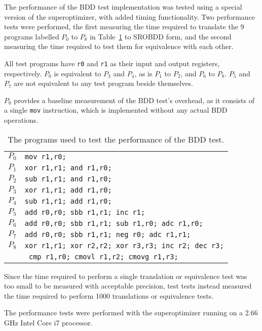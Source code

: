 \documentclass[a4paper,11pt]{kth-mag}
\begin{document}
The performance of the BDD test implementation was tested using a special version of the superoptimizer, with added timing functionality.
Two performance tests were performed,
the first measuring the time required to translate the 9 programs labelled $P_0$ to $P_8$ in Table~\ref{tab:test_programs} to SROBDD form,
and the second measuring the time required to test them for equivalence with each other.

All test programs have \verb|r0| and \verb|r1| as their input and output registers, respectively.
$P_0$ is equivalent to $P_3$ and $P_4$, as is $P_1$ to $P_2$, and $P_6$ to $P_8$.
$P_5$ and $P_7$ are not equivalent to any test program beside themselves.

$P_0$ provides a baseline measurement of the BDD test's overhead, as it consists of a single \verb|mov| instruction, which is implemented without any actual BDD operations.

\begin{table}
\centering
\begin{tabular}{l|l}
$P_0$ & \verb|mov r1,r0;| \\
$P_1$ & \verb|xor r1,r1; and r1,r0;| \\
$P_2$ & \verb|sub r1,r1; and r1,r0;| \\
$P_3$ & \verb|xor r1,r1; add r1,r0;| \\
$P_4$ & \verb|sub r1,r1; add r1,r0;| \\
$P_5$ & \verb|add r0,r0; sbb r1,r1; inc r1;| \\
$P_6$ & \verb|add r0,r0; sbb r1,r1; sub r1,r0; adc r1,r0;| \\
$P_7$ & \verb|add r0,r0; sbb r1,r1; neg r0; adc r1,r1;| \\
$P_8$ & \verb|xor r1,r1; xor r2,r2; xor r3,r3; inc r2; dec r3;|\\
      & \verb| cmp r1,r0; cmovl r1,r2; cmovg r1,r3;| \\
\end{tabular}
\caption{The programs used to test the performance of the BDD test.}
\label{tab:test_programs}
\end{table}

Since the time required to perform a single translation or equivalence test was too small to be measured with acceptable precision,
test tests instead measured the time required to perform 1000 translations or equivalence tests.

The performance tests were performed with the superoptimizer running on a 2.66 GHz Intel Core i7 processor.
\end{document}
